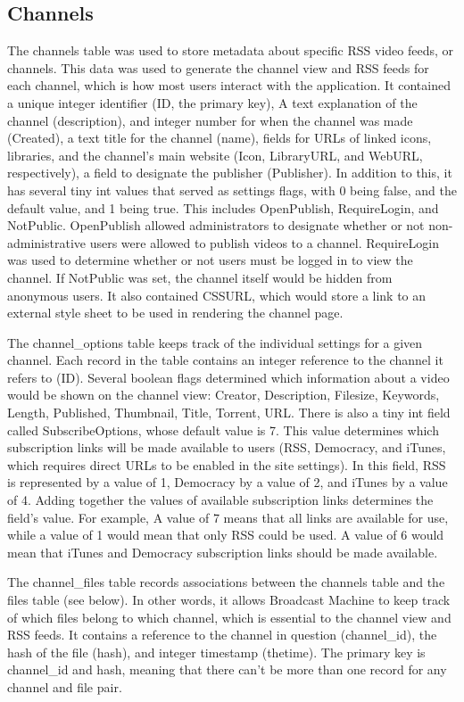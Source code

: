 \documentclass[a4paper,12pt]{report}
\begin{document}
\subsection{Channels}
The channels table was used to store metadata about specific RSS video feeds, or channels. This data was used to generate the channel view and RSS feeds for each channel, which is how most users interact with the application. 
It contained a unique integer identifier (ID, the primary key), A text explanation of the channel (description), and integer number for when the channel was made (Created), a text title for the channel (name), fields for URLs of linked icons, libraries, and the channel's main website (Icon, LibraryURL, and WebURL, respectively), a field to designate the publisher (Publisher). In addition to this, it has several tiny int values that served as settings flags, with 0 being false, and the default value, and 1 being true. This includes OpenPublish, RequireLogin, and NotPublic. OpenPublish allowed administrators to designate whether or not non-administrative users were allowed to publish videos to a channel. RequireLogin was used to determine whether or not users must be logged in to view the channel. If NotPublic was set, the channel itself would be hidden from anonymous users.
It also contained CSSURL, which would store a link to an external style sheet to be used in rendering the channel page.


The channel\_options table keeps track of the individual settings for a given channel. Each record in the table contains an integer reference to the channel it refers to (ID). Several boolean flags determined which information about a video would be shown on the channel view: Creator, Description, Filesize, Keywords, Length, Published, Thumbnail, Title, Torrent, URL. There is also a tiny int field called SubscribeOptions, whose default value is 7. This value determines which subscription links will be made available to users (RSS, Democracy, and iTunes, which requires direct URLs to be enabled in the site settings). In this field, RSS is represented by a value of 1, Democracy by a value of 2, and iTunes by a value of 4. Adding together the values of available subscription links determines the field's value. For example, A value of 7 means that all links are available for use, while a value of 1 would mean that only RSS could be used. A value of 6 would mean that iTunes and Democracy subscription links should be made available. 


The channel\_files table records associations between the channels table and the files table (see below). In other words, it allows Broadcast Machine to keep track of which files belong to which channel, which is essential to the channel view and RSS feeds. It contains a reference to the channel in question (channel\_id), the hash of the file (hash), and integer timestamp (thetime). The primary key is channel\_id and hash, meaning that there can't be more than one record for any channel and file pair.
\end{document}
